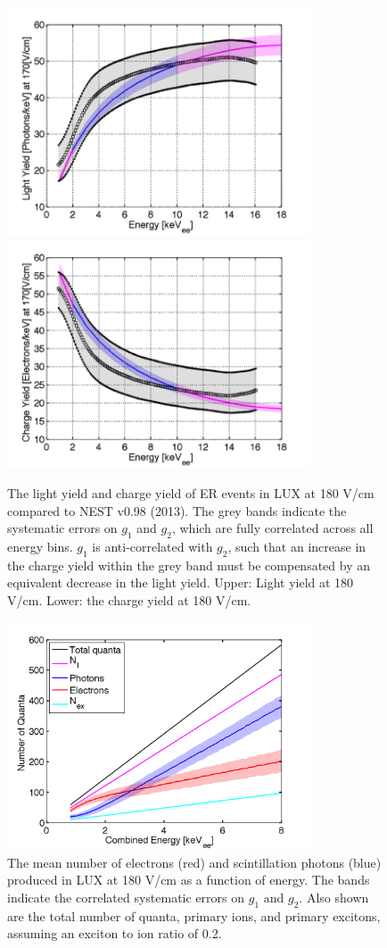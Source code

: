 \begin{figure}[h!]\centering
\includegraphics[width=90mm]{fig/ER-LY.png}
\includegraphics[width=90mm]{fig/ER-QY.png}
\caption{The light yield and charge yield of ER events in LUX at 180 V/cm compared to NEST v0.98 (2013). The grey bands indicate the systematic errors on $g_1$ and $g_2$, which are fully correlated across all energy bins. $g_1$ is anti-correlated with $g_2$, such that an increase in the charge yield within the grey band must be compensated by an equivalent decrease in the light yield. Upper: Light yield at 180 V/cm. Lower: the charge yield at 180 V/cm.}
\label{fig:ER-LY-QY}
\end{figure}


\begin{figure}[h!]\centering
\includegraphics[width=90mm]{fig/quanta-vs-energy.png}
\caption{The mean number of electrons (red) and scintillation photons (blue) produced in LUX at 180 V/cm as a function of energy. The bands indicate the correlated systematic errors on $g_1$ and $g_2$. Also shown are the total number of quanta, primary ions, and primary excitons, assuming an exciton to ion ratio of 0.2. }
\label{fig:quanta-vs-energy}
\end{figure}


